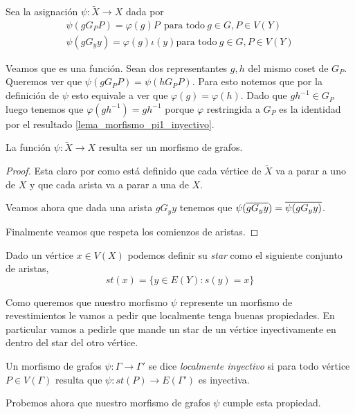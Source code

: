 \documentclass[tesis.tex]{subfiles}
\newcommand{\Xm}{\widetilde X}
\begin{document}
Sea la asignación $\psi: \Xm \to X$ dada por 
\begin{align*}
	\psi(g G_P P) = \varphi(g) P \ \ \text{para todo} \ g \in G, P \in V(Y) \\
	\psi(g G_y y) = \varphi(g) \iota(y) \text{para todo} \ g \in G, P \in V(Y)
\end{align*}

Veamos que es una función.
Sean dos representantes $g,h$ del mismo coset de $G_P$. 
Queremos ver que $\psi(gG_PP) = \psi(hG_P P)$.
Para esto notemos que por la definición de $\psi$  esto equivale a ver que $\varphi(g) = \varphi(h)$.
Dado que $gh^{-1} \in G_P$ luego tenemos que $\varphi(gh^{-1}) = gh^{-1}$ porque $\varphi$ restringida a $G_P$ es la identidad por el resultado \ref{lema_morfismo_pi1_inyectivo}.

\begin{lema}
	La función $\psi: \Xm \to X$ resulta ser un morfismo de grafos.
\end{lema}
\begin{proof}
	Esta claro por como está definido que cada vértice de $\Xm$ va a parar a uno de $X$ y que cada arista va a parar a una de $X$.
	
	Veamos ahora que dada una arista $g G_y y$ tenemos que $\psi(\overline{g G_y y}) = \overline{\psi(g G_y y)}$.
	
	
	Finalmente veamos que respeta los comienzos de aristas.
\end{proof}

Dado un vértice $x \in V(X)$ podemos definir su \emph{star} como el siguiente conjunto de aristas,
\[
	st(x) = \{  y \in E(Y) : s(y) = x  \}
\]

Como queremos que nuestro morfismo $\psi$ represente un morfismo de revestimientos le vamos a pedir que localmente tenga buenas propiedades. 
En particular vamos a pedirle que mande un star de un vértice inyectivamente en dentro del star del otro vértice.

\begin{deff}
	Un morfismo de grafos $\psi:\Gamma \to \Gamma'$ se dice \emph{localmente inyectivo} si para todo vértice $P \in V(\Gamma)$ resulta que $\psi: st(P) \to E(\Gamma')$ es inyectiva. 
\end{deff}

Probemos ahora que nuestro morfismo de grafos $\psi$ cumple esta propiedad.
\end{document}
